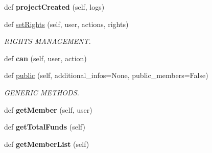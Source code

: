 \begin{DoxyCompactItemize}
def {\bfseries project\+Created} (self, logs)
\item 
\mbox{\label{classapp_1_1models_1_1organization_1_1_orga_document_a13a50e03bc43b1ecd36931679c230721}} 
def \hyperlink{classapp_1_1models_1_1organization_1_1_orga_document_a13a50e03bc43b1ecd36931679c230721}{set\+Rights} (self, user, actions, rights)
\begin{DoxyCompactList}\small\item\em R\+I\+G\+H\+TS M\+A\+N\+A\+G\+E\+M\+E\+NT. \end{DoxyCompactList}\item 
\mbox{\label{classapp_1_1models_1_1organization_1_1_orga_document_a4f4c41058cb6c471a61b5ec8b45563e1}} 
def {\bfseries can} (self, user, action)
\item 
\mbox{\label{classapp_1_1models_1_1organization_1_1_orga_document_ac309799f07941ed2a8857e4f5a347767}} 
def \hyperlink{classapp_1_1models_1_1organization_1_1_orga_document_ac309799f07941ed2a8857e4f5a347767}{public} (self, additional\+\_\+infos=None, public\+\_\+members=False)
\begin{DoxyCompactList}\small\item\em G\+E\+N\+E\+R\+IC M\+E\+T\+H\+O\+DS. \end{DoxyCompactList}\item 
\mbox{\label{classapp_1_1models_1_1organization_1_1_orga_document_ab8531e80c2ed80bd1c0b2bcc81eead6d}} 
def {\bfseries get\+Member} (self, user)
\item 
\mbox{\label{classapp_1_1models_1_1organization_1_1_orga_document_a1942a2e1c9cf6d6e42b4105ba84fbe6a}} 
def {\bfseries get\+Total\+Funds} (self)
\item 
\mbox{\label{classapp_1_1models_1_1organization_1_1_orga_document_a0837b7500de650d05b4ec0ce7cbc774a}} 
def {\bfseries get\+Member\+List} (self)
\item 
\mbox{\label{classapp_1_1models_1_1organization_1_1_orga_document_ac9bb01d210066cfbddc52466f0278761}} 

\end{DoxyCompactItemize}
